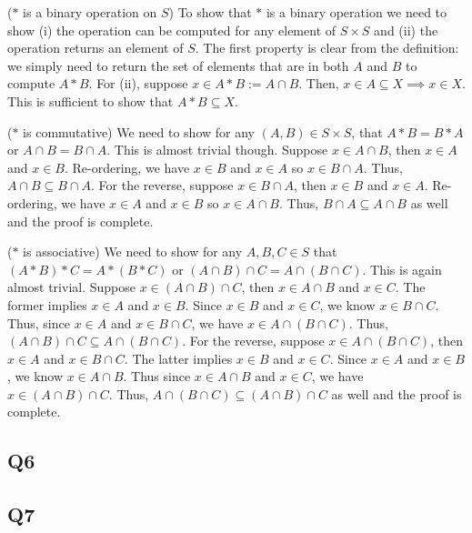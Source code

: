 \documentclass[12pt]{article}
\numberwithin{theorem}{section}
\numberwithin{equation}{section}
\numberwithin{remark}{section}
\numberwithin{definition}{section}
\numberwithin{theorem}{section}
\numberwithin{lemma}{section}
\numberwithin{example}{section}
\begin{document}
\vspace{\baselineskip}

\noindent ($*$ is a binary operation on $S$) To show that $*$ is a binary operation we need to show (i) the operation can be computed for any element of $S\times S$ and (ii) the operation returns an element of $S$. The first property is clear from the definition: we simply need to return the set of elements that are in both $A$ and $B$ to compute $A * B$. For (ii), suppose $x\in A * B := A \cap B$. Then, $x\in A \subseteq X \implies x \in X$. This is sufficient to show that $A * B \subseteq X$. 

\vspace{\baselineskip}

\noindent ($*$ is commutative) We need to show for any $(A,B)\in S\times S$, that $A * B = B * A$ or $A \cap B = B \cap A$. This is almost trivial though. Suppose $x\in A \cap B$, then $x \in A$ and $x \in B$. Re-ordering, we have $x\in B$ and $x \in A$ so $x \in B \cap A$. Thus, $A \cap B \subseteq B \cap A$. For the reverse, suppose $x \in B \cap A$, then $x \in B$ and $x \in A$. Re-ordering, we have $x \in A$ and $x\in B$ so $x \in A \cap B$. Thus, $B \cap A \subseteq A \cap B$ as well and the proof is complete. 

\vspace{\baselineskip}

\noindent ($*$ is associative) We need to show for any $A, B, C \in S$ that $(A * B) * C = A * (B * C)$ or $(A \cap B) \cap C = A \cap (B \cap C)$. This is again almost trivial. Suppose $x \in (A \cap B) \cap C$, then $x \in A \cap B$ and $x \in C$. The former implies $x \in A$ and $x \in B$. Since $x \in B$ and $x \in C$, we know $x \in B \cap C$. Thus, since $x \in A$ and $x \in B \cap C$, we have $x \in A \cap (B \cap C)$. Thus, $(A \cap B) \cap C \subseteq A \cap (B \cap C)$. For the reverse, suppose $x \in A \cap (B \cap C)$, then $x \in A$ and $x \in B \cap C$. The latter implies $x \in B$ and $x \in C$. Since $x \in A$ and $x \in B$, we know $x \in A \cap B$. Thus since $x \in A \cap B$ and $x \in C$, we have $x \in (A \cap B) \cap C$. Thus, $A \cap (B \cap C) \subseteq (A \cap B) \cap C$ as well and the proof is complete. 



\subsection{Q6}

\subsection{Q7}
\end{document}
